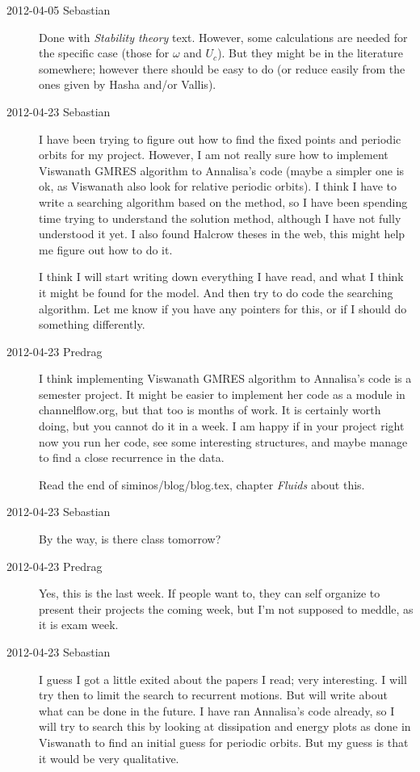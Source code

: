 \begin{description}
\item[2012-04-05 Sebastian]
Done with  \emph{Stability theory} text. However,
some calculations are needed for the specific case (those for $\omega$
and $U_c$). But they might be in the literature somewhere; however there
should be easy to do (or reduce easily from the ones given by Hasha
and/or Vallis).

\item[2012-04-23 Sebastian]
I have been trying to figure out how to find the fixed points and
periodic orbits for my project. However, I am not really sure how to
implement Viswanath GMRES algorithm to Annalisa's code (maybe a simpler
one is ok, as Viswanath also look for relative periodic orbits). I think
I have to write a searching algorithm based on the method, so I have been
spending time trying to understand the solution method, although I have
not fully understood it yet. I also found Halcrow theses in the web, this
might help me figure out how to do it.

I think I will start writing down everything I have read, and what I
think it might be found for the model. And then try to do code the
searching algorithm. Let me know if you have any pointers for this, or if
I should do something differently.

\item[2012-04-23 Predrag]
I think implementing Viswanath GMRES algorithm to Annalisa's code is a
semester project. It might be easier to implement her code as a module in
channelflow.org, but that too is months of work. It is certainly worth
doing, but you cannot do it in a week. I am happy if in your project
right now you run her code, see some interesting structures, and maybe
manage to find a close recurrence in the data.

Read the end of siminos/blog/blog.tex, chapter {\em Fluids} about this.

\item[2012-04-23 Sebastian]
By the way, is there class tomorrow?

\item[2012-04-23 Predrag]
Yes, this is the last week. If people want to, they can self organize to present their
projects the coming week, but I'm not supposed to meddle, as it is exam week.

\item[2012-04-23 Sebastian]
I guess I got a little exited about the papers I read; very interesting. I will try then to limit the search to recurrent motions. But will write about what can be done in the future. I have ran Annalisa's code already, so I will try to search this by looking at dissipation and energy plots as done in Viswanath to find an initial guess for periodic orbits. But my guess is that it would be very qualitative.


\end{description}
